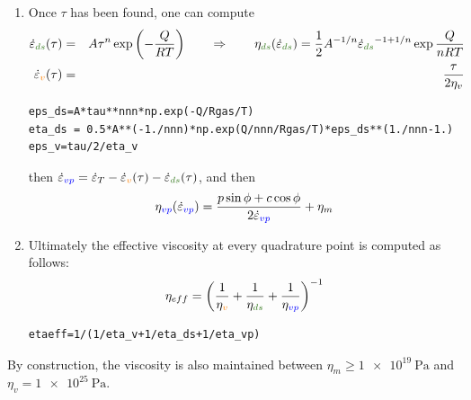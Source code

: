 \begin{enumerate}
\item Once $\tau$ has been found, one can compute 
\begin{eqnarray}
\dot{\varepsilon}_{\color{OliveGreen}ds}(\tau)&=&A \tau^n \exp \left(-\frac{Q}{RT}\right)
\qquad 
\Rightarrow 
\qquad 
\eta_{\color{OliveGreen}ds}(\dot\varepsilon_{\color{OliveGreen}ds}) 
= \frac{1}{2} A^{-1/n} \dot{\varepsilon}_{\color{OliveGreen}ds}^{-1+1/n} \exp \frac{Q}{nRT} \nn\\
\dot{\varepsilon}_{\color{orange}v}(\tau)&=&\frac{\tau}{2\eta_v}  \nn
\end{eqnarray}
\begin{lstlisting}
eps_ds=A*tau**nnn*np.exp(-Q/Rgas/T)
eta_ds = 0.5*A**(-1./nnn)*np.exp(Q/nnn/Rgas/T)*eps_ds**(1./nnn-1.)
eps_v=tau/2/eta_v
\end{lstlisting}
then 
$\dot{\varepsilon}_{\color{blue}vp}
=\dot{\varepsilon}_T 
-\dot{\varepsilon}_{\color{orange}v}(\tau) 
-\dot{\varepsilon}_{\color{OliveGreen}ds}(\tau)$,
and then 
\[
\eta_{\color{blue} vp}(\dot\varepsilon_{\color{blue} vp}) 
= \frac{p \sin \phi + c \cos \phi}{2 \dot{\varepsilon}_{\color{blue}vp}}  + \eta_{m}
\]
\item 
Ultimately the effective viscosity at every quadrature point is computed as follows:
\[
\eta_{eff} = \left(
\frac{1}{\eta_{\color{orange}v}} + 
\frac{1}{\eta_{\color{OliveGreen}ds}}  + 
\frac{1}{\eta_{\color{blue}vp}}  
\right)^{-1}
\]
\begin{lstlisting}
etaeff=1/(1/eta_v+1/eta_ds+1/eta_vp)
\end{lstlisting}

\end{enumerate}

 
By construction, the viscosity is also maintained between $\eta_{m}\ge \SI{1e19}{\pascal}$ 
and $\eta_{v}=\SI{1e25}{\pascal}$. 

